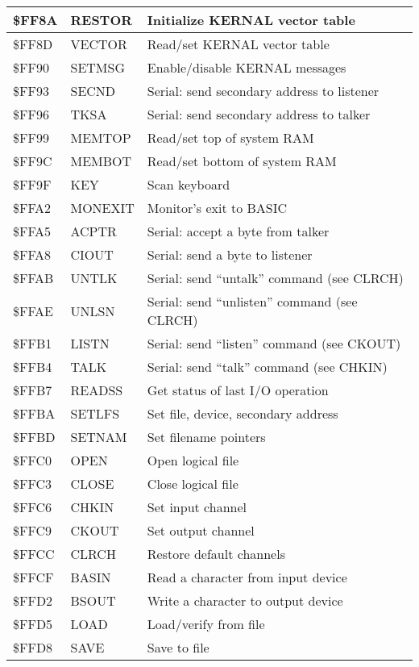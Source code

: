 \begin{longtable}{|L{2cm}|p{2cm}|L{7cm}|}
\hline
\$FF8A & RESTOR & Initialize KERNAL vector table \\
\hline
\$FF8D & VECTOR & Read/set KERNAL vector table \\
\hline
\$FF90 & SETMSG & Enable/disable KERNAL messages \\
\hline
\$FF93 & SECND & Serial: send secondary address to listener \\
\hline
\$FF96 & TKSA & Serial: send secondary address to talker \\
\hline
\$FF99 & MEMTOP & Read/set top of system RAM \\
\hline
\$FF9C & MEMBOT & Read/set bottom of system RAM \\
\hline
\$FF9F & KEY & Scan keyboard \\
\hline
\$FFA2 & MONEXIT & Monitor's exit to BASIC \\
\hline
\$FFA5 & ACPTR & Serial: accept a byte from talker \\
\hline
\$FFA8 & CIOUT & Serial: send a byte to listener \\
\hline
\$FFAB & UNTLK & Serial: send ``untalk'' command (see CLRCH) \\
\hline
\$FFAE & UNLSN & Serial: send ``unlisten'' command (see CLRCH) \\
\hline
\$FFB1 & LISTN & Serial: send ``listen'' command (see CKOUT) \\
\hline
\$FFB4 & TALK & Serial: send ``talk'' command (see CHKIN) \\
\hline
\$FFB7 & READSS & Get status of last I/O operation \\
\hline
\$FFBA & SETLFS & Set file, device, secondary address \\
\hline
\$FFBD & SETNAM & Set filename pointers \\
\hline
\$FFC0 & OPEN & Open logical file \\
\hline
\$FFC3 & CLOSE & Close logical file \\
\hline
\$FFC6 & CHKIN & Set input channel \\
\hline
\$FFC9 & CKOUT & Set output channel \\
\hline
\$FFCC & CLRCH & Restore default channels \\
\hline
\$FFCF & BASIN & Read a character from input device \\
\hline
\$FFD2 & BSOUT & Write a character to output device \\
\hline
\$FFD5 & LOAD & Load/verify from file \\
\hline
\$FFD8 & SAVE & Save to file \\

\end{longtable}
